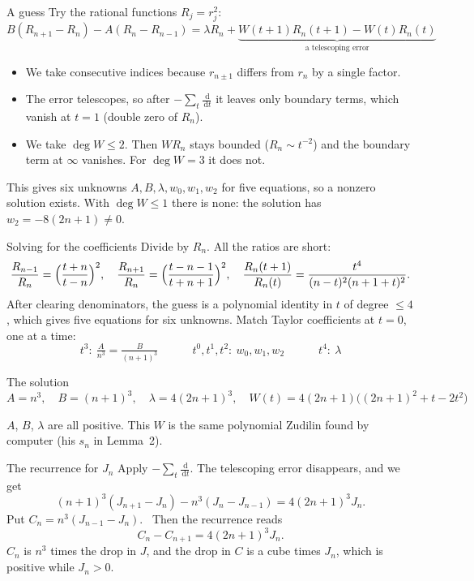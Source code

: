\documentclass[aspectratio=169,11pt]{beamer}
\newcommand{\dd}{\,\mathrm{d}}
\begin{document}
\begin{frame}{A guess}
  Try the rational functions $R_j=r_j^2$:
  \[
    B(R_{n+1}-R_n)-A(R_n-R_{n-1})=\lambda R_n+\underbrace{W(t+1)R_n(t+1)-W(t)R_n(t)}_{\text{a telescoping error}}
  \]
  \pause
  \begin{itemize}
    \item We take consecutive indices because $r_{n\pm1}$ differs from $r_n$ by a single factor.
    \item The error telescopes, so after $-\sum_t\frac{\dd}{\dd t}$ it leaves only boundary terms,
      which vanish at $t=1$ (double zero of $R_n$).
    \item We take $\deg W\le2$. Then $WR_n$ stays bounded ($R_n\sim t^{-2}$) and the boundary term
      at $\infty$ vanishes. For $\deg W=3$ it does not.
  \end{itemize}
  \pause
  This gives six unknowns $A,B,\lambda,w_0,w_1,w_2$ for five equations, so a nonzero solution
  exists. With $\deg W\le1$ there is none: the solution has $w_2=-8(2n+1)\ne0$.
\end{frame}

\begin{frame}{Solving for the coefficients}
  Divide by $R_n$. All the ratios are short:
  {\small
  \[
    \frac{R_{n-1}}{R_n}=\Bigl(\frac{t+n}{t-n}\Bigr)^2,\quad
    \frac{R_{n+1}}{R_n}=\Bigl(\frac{t-n-1}{t+n+1}\Bigr)^2,\quad
    \frac{R_n(t+1)}{R_n(t)}=\frac{t^4}{(n-t)^2(n+1+t)^2}.
  \]}%
  After clearing denominators, the guess is a polynomial identity in $t$ of degree $\le4$,
  which gives five equations for six unknowns. Match Taylor coefficients at $t=0$, one at a time:
  \[
    t^3:\ \tfrac A{n^3}=\tfrac B{(n+1)^3}
    \qquad\quad t^0,t^1,t^2:\ w_0,w_1,w_2
    \qquad\quad t^4:\ \lambda
  \]
  \pause
  \begin{block}{The solution}
    \centering
    $A=n^3,\quad B=(n+1)^3,\quad\lambda=4(2n+1)^3,\quad
    W(t)=4(2n+1)\bigl((2n+1)^2+t-2t^2\bigr)$
    \\[3pt]
    \raggedright
    $A$, $B$, $\lambda$ are all positive.
    This $W$ is the same polynomial Zudilin found by computer (his $s_n$ in Lemma~2).
  \end{block}
\end{frame}

\begin{frame}{The recurrence for $J_n$}
  Apply $-\sum_t\frac{\dd}{\dd t}$. The telescoping error disappears, and we get
  \[
    (n+1)^3(J_{n+1}-J_n)-n^3(J_n-J_{n-1})=4(2n+1)^3J_n .
  \]
  \pause
  Put $C_n=n^3(J_{n-1}-J_n)$. \ Then the recurrence reads
  \[
    C_n-C_{n+1}=4(2n+1)^3J_n .
  \]
  $C_n$ is $n^3$ times the drop in $J$, and the drop in $C$ is a cube times $J_n$, which is
  positive while $J_n>0$.
\end{frame}
\end{document}
